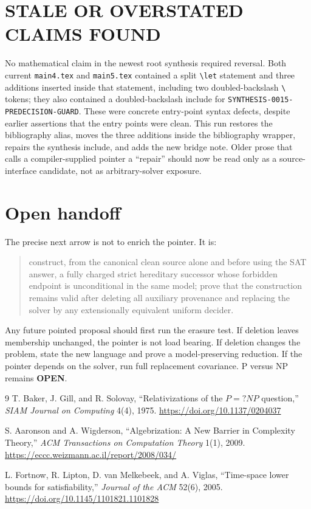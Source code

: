 \documentclass[11pt]{article}
\newcommand{\OPEN}{\textbf{OPEN}}
\begin{document}
\section{STALE OR OVERSTATED CLAIMS FOUND}

No mathematical claim in the newest root synthesis required reversal.  Both current \texttt{main4.tex} and \texttt{main5.tex} contained a split \verb|\let| statement and three additions inserted inside that statement, including two doubled-backslash \verb|\| tokens; they also contained a doubled-backslash include for \texttt{SYNTHESIS-0015-PREDECISION-GUARD}.  These were concrete entry-point syntax defects, despite earlier assertions that the entry points were clean.  This run restores the bibliography alias, moves the three additions inside the bibliography wrapper, repairs the synthesis include, and adds the new bridge note.  Older prose that calls a compiler-supplied pointer a ``repair'' should now be read only as a source-interface candidate, not as arbitrary-solver exposure.

\section{Open handoff}

The precise next arrow is not to enrich the pointer.  It is:
\begin{quote}
construct, from the canonical clean source alone and before using the SAT answer, a fully charged strict hereditary successor whose forbidden endpoint is unconditional in the same model; prove that the construction remains valid after deleting all auxiliary provenance and replacing the solver by any extensionally equivalent uniform decider.
\end{quote}
Any future pointed proposal should first run the erasure test.  If deletion leaves membership unchanged, the pointer is not load bearing.  If deletion changes the problem, state the new language and prove a model-preserving reduction.  If the pointer depends on the solver, run full replacement covariance.  P versus NP remains \OPEN.

\begin{thebibliography}{9}
T. Baker, J. Gill, and R. Solovay,
``Relativizations of the $P=?NP$ question,''
\emph{SIAM Journal on Computing} 4(4), 1975.
\url{https://doi.org/10.1137/0204037}

S. Aaronson and A. Wigderson,
``Algebrization: A New Barrier in Complexity Theory,''
\emph{ACM Transactions on Computation Theory} 1(1), 2009.
\url{https://eccc.weizmann.ac.il/report/2008/034/}

L. Fortnow, R. Lipton, D. van Melkebeek, and A. Viglas,
``Time-space lower bounds for satisfiability,''
\emph{Journal of the ACM} 52(6), 2005.
\url{https://doi.org/10.1145/1101821.1101828}
\end{thebibliography}

\end{document}

